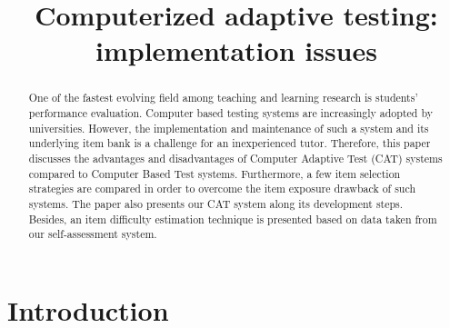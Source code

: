 \documentclass[11pt,twoside]{article}
\begin{document}
\title{Computerized adaptive testing: implementation issues
}
\maketitle











\begin{abstract}
One of the fastest evolving field among teaching and learning research is students' performance evaluation. Computer based testing systems are increasingly adopted by universities. However, the implementation and maintenance of such a system and its underlying item bank is a challenge for an inexperienced tutor. Therefore, this paper discusses the advantages and disadvantages of Computer Adaptive Test (CAT) systems compared to Computer Based Test systems. Furthermore, a few item selection strategies are compared in order to overcome the item exposure drawback of such systems. The paper also presents our CAT system along its development steps. Besides, an item difficulty estimation technique is presented  based on data taken from our self-assessment system.
\end{abstract}

\newpage

\section{Introduction}
\end{document}
